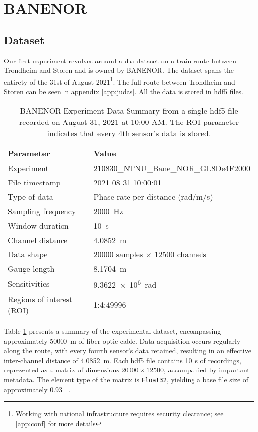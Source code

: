 \section{BANENOR}

\subsection{Dataset}

Our first experiment revolves around a \acrshort{das} dataset on a train route between Trondheim and Storen and is owned by BANENOR. The dataset spans the entirety of the 31st of August 2021\footnote{Working with national infrastructure requires security clearance; see \ref{app:conf} for more details}. The full route between Trondheim and Storen can be seen in appendix \ref{app:judas}. All the data is stored in \acrshort{hdf5} files.

\begin{table}[!h]
    \centering
    \small
    \begin{tabular}{@{}p{}p{}@{}}
        \toprule
        \textbf{Parameter} & \textbf{Value} \\
        \midrule
        Experiment & 210830\_NTNU\_Bane\_NOR\_GL8De4F2000  \\
        File timestamp & 2021-08-31 10:00:01  \\
        Type of data & Phase rate per distance (rad/m/s) \\
        Sampling frequency & \qty{2000}{\hertz} \\
        Window duration & \qty{10}{\second} \\
        Channel distance & \qty{4.0852}{\meter} \\
        \midrule
        Data shape & 20000 samples \(\times\) 12500 channels  \\
        \midrule
        Gauge length & \qty{8.1704}{\meter} \\
        Sensitivities & \qty{9.3622e6}{\radian} \\
        Regions of interest (ROI) & 1:4:49996 \\
        \bottomrule
    \end{tabular}
    \caption{BANENOR Experiment Data Summary from a single \acrshort{hdf5} file recorded on August 31, 2021 at 10:00 AM. The ROI parameter indicates that every 4th sensor's data is stored.}
    \label{tab:experiment_data}
\end{table}

Table \ref{tab:experiment_data} presents a summary of the experimental dataset, encompassing approximately \qty{50000}{\meter} of fiber-optic cable. Data acquisition occurs regularly along the route, with every fourth sensor's data retained, resulting in an effective inter-channel distance of \qty{4.0852}{\meter}. Each \acrshort{hdf5} file contains \qty{10}{\second} of recordings, represented as a matrix of dimensions $20000 \times 12500$, accompanied by important metadata. The element type of the matrix is \texttt{Float32}, yielding a base file size of approximately \qty{0.93}{\giga\byte}.

